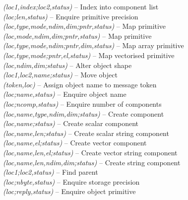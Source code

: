 \documentclass[twoside,11pt]{starlink}
\providecommand{\st}[1]{{\emph{#1}}}
\begin{document}
\textbf{}\st{(loc1,index;loc2,status)} -- Index into component list \\
\textbf{}\st{(loc;len,status)} -- Enquire primitive precision \\
\textbf{}\st{(loc,type,mode,ndim,dim;pntr,status)} -- Map primitive \\
\textbf{}\st{(loc,mode,ndim,dim;pntr,status)} -- Map primitive \\
\textbf{}\st{(loc,type,mode,ndim;pntr,dim,status)} -- Map array primitive\\
\textbf{}\st{(loc,type,mode;pntr,el,status)} -- Map vectorised primitive\\
\textbf{}\st{(loc,ndim,dim;status)} -- Alter object shape \\
\textbf{}\st{(loc1,loc2,name;status)} -- Move object \\
\textbf{}\st{(token,loc)} -- Assign object name to message token \\
\textbf{}\st{(loc;name,status)} -- Enquire object name \\
\textbf{}\st{(loc;ncomp,status)} -- Enquire number of components \\
\textbf{}\st{(loc,name,type,ndim,dim;status)} -- Create component \\
\textbf{}\st{(loc,name;status)} -- Create scalar component\\
\textbf{}\st{(loc,name,len;status)} -- Create scalar string component\\
\textbf{}\st{(loc,name,el;status)} -- Create vector component\\
\textbf{}\st{(loc,name,len,el;status)} -- Create vector string component\\
\textbf{}\st{(loc,name,len,ndim,dim;status)} -- Create string component\\
\textbf{}\st{(loc1;loc2,status)} -- Find parent \\
\textbf{}\st{(loc;nbyte,status)} -- Enquire storage precision\\
\textbf{}\st{(loc;reply,status)} -- Enquire object primitive \\
\end{document}
